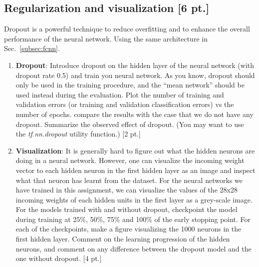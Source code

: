 \documentclass[12pt,letterpaper]{article}
\begin{document}
\subsection{Regularization and visualization [6 pt.]}
Dropout is a powerful technique to reduce overfitting and to enhance the overall performance of the neural network. Using the same architecture in Sec.~\ref{subsec:fcnn}. 
\begin{enumerate}
\item  \textbf{Dropout}: Introduce dropout on the hidden layer of the neural network (with dropout rate 0.5) and train you neural network. As you know, dropout should only be used in the training procedure, and the ``mean network'' should be used instead during the evaluation. Plot the number of training and validation errors {\color{red}(or training and validation classification errors)} vs the number of epochs. compare the results with the case that we do not have any dropout. Summarize the observed effect of dropout. (You may want to use the \textit{tf.nn.dropout} utility function.) [2 pt.]
\item  \textbf{Visualization}: It is generally hard to figure out what the hidden neurons are doing in a neural network. However, one can visualize the incoming weight vector to each hidden neuron in the first hidden layer as an image and inspect what that neuron has learnt from the dataset. For the neural networks we have trained in this assignment, we can visualize the values of the 28x28 incoming weights of each hidden units in the first layer as a grey-scale image. For the models trained with and without dropout, checkpoint the model during training at 25\%, 50\%, 75\% and 100\% of the early stopping point. For each of the checkpoints, make a figure visualizing the 1000 neurons in the first hidden layer. Comment on the learning progression of the hidden neurons, and comment on any difference between the dropout model and the one without dropout. [4 pt.]
\
\end{enumerate}
\end{document}
